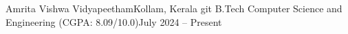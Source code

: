 \resumeSubheading
  {Amrita Vishwa Vidyapeetham}{Kollam, Kerala}
git   {B.Tech Computer Science and Engineering (CGPA: 8.09/10.0)}{July 2024 -- Present}
